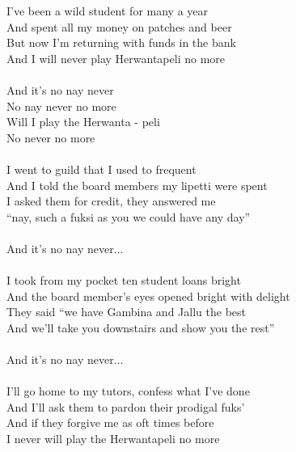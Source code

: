 
            I’ve been a wild student for many a year \\
            And spent all my money on patches and beer \\
            But now I’m returning with funds in the bank \\
            And I will never play Herwantapeli no more \\
\hspace{10mm} \\
            And it’s no nay never \\
            No nay never no more \\
            Will I play the Herwanta - peli \\
            No never no more \\
             \\
            I went to guild that I used to frequent \\
            And I told the board members my lipetti were spent \\
            I asked them for credit, they answered me \\
            “nay, such a fuksi as you we could have any day” \\
\hspace{10mm} \\
            And it’s no nay never... \\
\hspace{10mm} \\
            I took from my pocket ten student loans bright \\
            And the board member’s eyes opened bright with delight \\
            They said “we have Gambina and Jallu the best \\
            And we’ll take you downstairs and show you the rest” \\
\hspace{10mm} \\
            And it’s no nay never... \\
\hspace{10mm} \\
            I’ll go home to my tutors, confess what I’ve done \\
            And I’ll ask them to pardon their prodigal fuks’ \\
            And if they forgive me as oft times before \\
            I never will play the Herwantapeli no more \\
